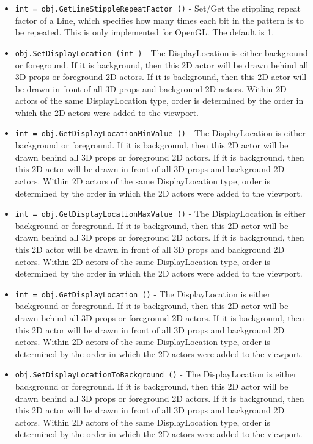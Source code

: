 \begin{itemize}
\item  \verb|int = obj.GetLineStippleRepeatFactor ()| -  Set/Get the stippling repeat factor of a Line, which specifies how
 many times each bit in the pattern is to be repeated.
 This is only implemented for OpenGL. The default is 1.

\item  \verb|obj.SetDisplayLocation (int )| -  The DisplayLocation is either background or foreground.
 If it is background, then this 2D actor will be drawn
 behind all 3D props or foreground 2D actors. If it is
 background, then this 2D actor will be drawn in front of
 all 3D props and background 2D actors. Within 2D actors
 of the same DisplayLocation type, order is determined by
 the order in which the 2D actors were added to the viewport.

\item  \verb|int = obj.GetDisplayLocationMinValue ()| -  The DisplayLocation is either background or foreground.
 If it is background, then this 2D actor will be drawn
 behind all 3D props or foreground 2D actors. If it is
 background, then this 2D actor will be drawn in front of
 all 3D props and background 2D actors. Within 2D actors
 of the same DisplayLocation type, order is determined by
 the order in which the 2D actors were added to the viewport.

\item  \verb|int = obj.GetDisplayLocationMaxValue ()| -  The DisplayLocation is either background or foreground.
 If it is background, then this 2D actor will be drawn
 behind all 3D props or foreground 2D actors. If it is
 background, then this 2D actor will be drawn in front of
 all 3D props and background 2D actors. Within 2D actors
 of the same DisplayLocation type, order is determined by
 the order in which the 2D actors were added to the viewport.

\item  \verb|int = obj.GetDisplayLocation ()| -  The DisplayLocation is either background or foreground.
 If it is background, then this 2D actor will be drawn
 behind all 3D props or foreground 2D actors. If it is
 background, then this 2D actor will be drawn in front of
 all 3D props and background 2D actors. Within 2D actors
 of the same DisplayLocation type, order is determined by
 the order in which the 2D actors were added to the viewport.

\item  \verb|obj.SetDisplayLocationToBackground ()| -  The DisplayLocation is either background or foreground.
 If it is background, then this 2D actor will be drawn
 behind all 3D props or foreground 2D actors. If it is
 background, then this 2D actor will be drawn in front of
 all 3D props and background 2D actors. Within 2D actors
 of the same DisplayLocation type, order is determined by
 the order in which the 2D actors were added to the viewport.


\end{itemize}
